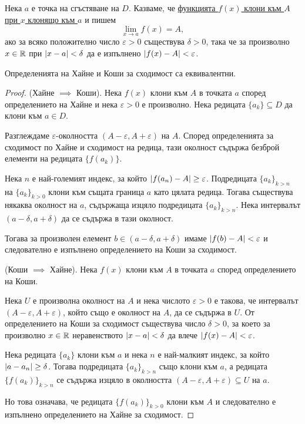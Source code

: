 \documentclass[numbers=endperiod, DIV=15, bibliography=totocnumbered]{scrartcl}
\begin{document}
\begin{definition}
  Нека $a$ е точка на сгъстяване на $D$. Казваме, че \uline{функцията $f(x)$ клони към $A$ при $x$ клонящо към $a$} и пишем
  \begin{displaymath}
    \lim_{x \to a} f(x) = A,
  \end{displaymath}
  ако за всяко положително число $\varepsilon > 0$ съществува $\delta > 0$, така че за произволно $x \in \mathbb{R}$ при $\left\vert x - a \right\vert < \delta$ да е изпълнено $\left\vert f(x) - A \right\vert < \varepsilon$.
\end{definition}

\begin{theorem}
  Определенията на Хайне и Коши за сходимост са еквивалентни.
\end{theorem}
\begin{proof}
  (Хайне $\implies$ Коши). Нека $f(x)$ клони към $A$ в точката $a$ според определението на Хайне и нека $\varepsilon > 0$ е произволно. Нека редицата $\{ a_k \} \subseteq D$ да клони към $a \in D$.

  Разглеждаме $\varepsilon$-околността $(A - \varepsilon, A + \varepsilon)$ на $A$. Според определенията за сходимост по Хайне и сходимост на редица, тази околност съдържа безброй елементи на редицата $\{ f(a_k) \}$.

  Нека $n$ е най-големият индекс, за който $\left\vert f(a_n) - A \right\vert \geq \varepsilon$. Подредицата ${\{ a_k \}}_{k > n}$ на ${\{ a_k \}}_{k > 0}$ клони към същата граница $a$ като цялата редица. Тогава съществува някаква околност на $a$, съдържаща изцяло подредицата ${\{ a_k \}}_{k > n}$. Нека интервалът $(a - \delta, a + \delta)$ да се съдържа в тази околност.

  Тогава за произволен елемент $b \in (a - \delta, a + \delta)$ имаме $\left\vert f(b) - A \right\vert < \varepsilon$ и следователно е изпълнено определението на Коши за сходимост.

  (Коши $\implies$ Хайне). Нека $f(x)$ клони към $A$ в точката $a$ според определението на Коши.

  Нека $U$ е произволна околност на $A$ и нека числото $\varepsilon > 0$ е такова, че интервалът $(A - \varepsilon, A + \varepsilon)$, който също е околност на $A$, да се съдържа в $U$. От определението на Коши за сходимост съществува число $\delta > 0$, за което за произволно $x \in \mathbb{R}$ неравенството $\left\vert x - a \right\vert < \delta$ да влече $\left\vert f(x) - A \right\vert < \varepsilon$.

  Нека редицата $\{ a_k \}$ клони към $a$ и нека $n$ е най-малкият индекс, за който $\left\vert a - a_n \right\vert \geq \delta$. Тогава подредицата ${\{ a_k \}}_{k>n}$ също клони към $a$, а редицата ${\{ f(a_k) \}}_{k>n}$ се съдържа изцяло в околността $(A - \varepsilon, A + \varepsilon) \subseteq U$ на $a$.

  Но това означава, че редицата ${\{ f(a_k) \}}_{k>0}$ клони към $A$ и следователно е изпълнено определението на Хайне за сходимост.
\end{proof}
\end{document}

